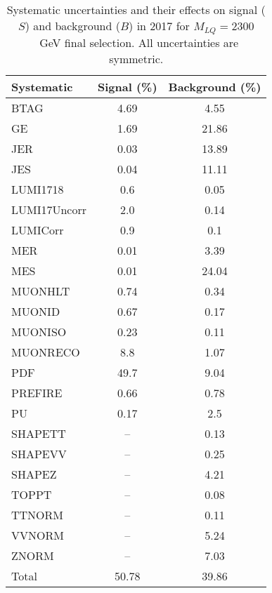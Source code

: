\begin{table}[htbp]
\begin{center}
\caption{Systematic uncertainties and their effects on signal ($S$) and background ($B$) in 2017 for $M_{LQ}=2300$~GeV final selection. All uncertainties are symmetric.}
\begin{tabular}{lcc}
\hline\hline
Systematic & Signal (\%) & Background (\%) \\ \hline 
BTAG & 4.69 & 4.55\\ 
GE & 1.69 & 21.86\\ 
JER & 0.03 & 13.89\\ 
JES & 0.04 & 11.11\\ 
LUMI1718 & 0.6 & 0.05\\ 
LUMI17Uncorr & 2.0 & 0.14\\ 
LUMICorr & 0.9 & 0.1\\ 
MER & 0.01 & 3.39\\ 
MES & 0.01 & 24.04\\ 
MUONHLT & 0.74 & 0.34\\ 
MUONID & 0.67 & 0.17\\ 
MUONISO & 0.23 & 0.11\\ 
MUONRECO & 8.8 & 1.07\\ 
PDF & 49.7 & 9.04\\ 
PREFIRE & 0.66 & 0.78\\ 
PU & 0.17 & 2.5\\ 
SHAPETT & -- & 0.13\\ 
SHAPEVV & -- & 0.25\\ 
SHAPEZ & -- & 4.21\\ 
TOPPT & -- & 0.08\\ 
TTNORM & -- & 0.11\\ 
VVNORM & -- & 5.24\\ 
ZNORM & -- & 7.03\\ 
Total & 50.78 & 39.86\\ \hline \hline
\end{tabular}
\label{tab:SysUncertainties_uujj_2300}
\end{center}
\end{table}

